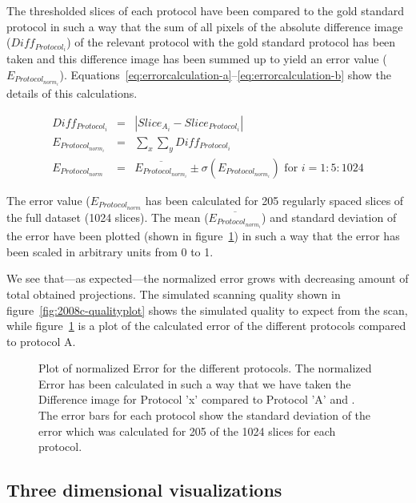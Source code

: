 The thresholded slices of each protocol have been compared to the gold standard protocol in such a way that the sum of all pixels of the absolute difference image ($Diff_{Protocol_{i}}$) of the relevant protocol with the gold standard protocol has been taken and this difference image has been summed up to yield an error value ($E_{Protocol_{norm_{i}}}$). Equations~\ref{eq:errorcalculation-a}--\ref{eq:errorcalculation-b} show the details of this calculations.

\begin{eqnarray}
    Diff_{Protocol_{i}} &=& |Slice_{A_{i}}-Slice_{Protocol_{i}}| \label{eq:errorcalculation-a}\\
E_{Protocol_{norm_{i}}} &=& \sum_{x}\sum_{y} Diff_{Protocol_{i}} \label{eq:errorcalculation-b}\\
    E_{Protocol_{norm}} &=& \overline{E_{Protocol_{norm_{i}}}} \pm \sigma(E_{Protocol_{norm_{i}}}) \textrm{ for } i=1:5:1024 \label{eq:errorcalculation-c}
\end{eqnarray}

The error value ($E_{Protocol_{norm}}$ has been calculated for 205 regularly spaced slices of the full dataset (1024 slices). The mean ($\overline{E_{Protocol_{norm_{i}}}}$) and standard deviation of the error have been plotted (shown in figure~\ref{fig:NormalizedErrorPlot}) in such a way that the error has been scaled in arbitrary units from 0 to 1.

We see that---as expected---the normalized error grows with decreasing amount of total obtained projections. The simulated scanning quality shown in figure~\ref{fig:2008c-qualityplot} shows the simulated quality to expect from the scan, while figure~\ref{fig:NormalizedErrorPlot} is a plot of the calculated error of the different protocols compared to protocol A.

\begin{figure}
	\centering
		
	\caption{Plot of normalized Error for the different protocols. The normalized Error has been calculated in such a way that we have taken the Difference image for Protocol 'x' compared to Protocol 'A' and . The error bars for each protocol show the standard deviation of the error which was calculated for 205 of the 1024 slices for each protocol.}
	\label{fig:NormalizedErrorPlot}
\end{figure}

\subsection{Three dimensional visualizations}
